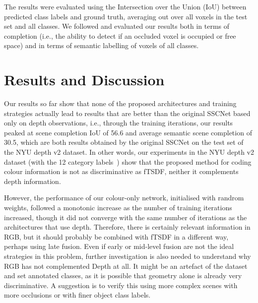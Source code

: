 
The results were evaluated using the Intersection over the Union
(IoU) between predicted class labels and ground truth, averaging out
over all voxels in the test set and all classes.
We followed \cite{song_etal_SSCnet_cvpr2017} and evaluated our
results both in terms of completion (i.e., the ability to
detect if an occluded voxel is occupied or free space) and
in terms of semantic labelling of voxels of all classes.

\section{Results and Discussion}

Our results so far show that none of the proposed architectures and
training strategies actually lead to results that are better than
the original SSCNet based only on depth observations, i.e.,
through the training iterations, our results peaked at
scene completion IoU of 56.6 and average semantic
scene completion of 30.5, which are both results
obtained by the original SSCNet on the test set of the NYU depth v2 dataset.
In other words, our experiments in the NYU depth v2 dataset
(with the 12 category labels~\cite{handa_etal_SceneNet_cvpr2016})
show that the proposed method for coding colour information
is not as discriminative as fTSDF, neither it complements
depth information.

However, the performance of our colour-only network, initialised with
randrom weights, followed a monotonic increase as the number
of training iterations increased, though it did not converge
with the same number of iterations as the architectures
that use depth.
Therefore, there is certainly relevant information in RGB, but
it should probably be combined with fTSDF in a different way,
perhaps using late fusion.
Even if early or mid-level fusion are not the ideal strategies
in this problem, further investigation is also needed to
understand why RGB has not complemented Depth at all. It might
be an artefact of the dataset and set annotated classes,
as it is possible that geometry alone is already very
discriminative. A suggestion is to verify this using
more complex scenes with more occlusions or with finer
object class labels.

